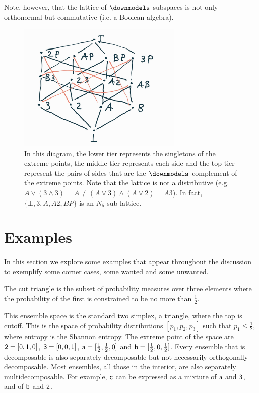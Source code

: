 Note, however, that the lattice of $\separate$-subspaces is not only orthonormal but commutative (i.e. a Boolean algebra).

\begin{figure}[h]
	\centering
	\includegraphics[width=0.7\textwidth]{tempimages/CutTriangleSubspaces2.jpg}
	\caption{In this diagram, the lower tier represents the singletons of the extreme points, the middle tier represents each side and the top tier represent the pairs of sides that are the $\separate$-complement of the extreme points. Note that the lattice is not a distributive (e.g. $A\vee (3 \wedge 3) = A \neq (A\vee 3) \wedge (A \vee 2) = A3$). In fact, $\{\bot, 3, A, A2, BP\}$ is an $N_5$ sub-lattice. }
\end{figure}



\section{Examples}

In this section we explore some examples that appear throughout the discussion to exemplify some corner cases, some wanted and some unwanted.

\begin{example}\label{pm_es_cutTriangle}
	The cut triangle is the subset of probability measures over three elements where the probability of the first is constrained to be no more than $\frac{1}{2}$.
\end{example}

This ensemble space is the standard two simplex, a triangle, where the top is cutoff. This is the space of probability distributions $[p_1, p_2, p_3]$ such that $p_1 \leq \frac{1}{2}$, where entropy is the Shannon entropy. The extreme point of the space are $\ens[2] = [0,1,0]$, $\ens[3] = [0,0,1]$, $\ens[a] = [\frac{1}{2},\frac{1}{2},0]$ and $\ens[b] = [\frac{1}{2},0,\frac{1}{2}]$. Every ensemble that is decomposable is also separately decomposable but not necessarily orthogonally decomposable. Most ensembles, all those in the interior, are also separately multidecomposable. For example, $\ens[c]$ can be expressed as a mixture of $\ens[a]$ and $\ens[3]$, and of $\ens[b]$ and $\ens[2]$.


